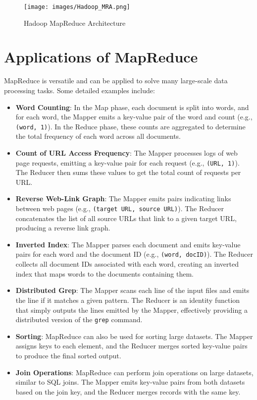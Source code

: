 \documentclass[12pt]{article}
\begin{document}
\begin{figure}[htbp]
    \centering
    \texttt{[image: images/Hadoop\_MRA.png]}
    \caption{Hadoop MapReduce Architecture}
    \label{fig:mapreduce}
\end{figure}

\section{Applications of MapReduce}
MapReduce is versatile and can be applied to solve many large-scale data processing tasks. Some detailed examples include:

\begin{itemize}
    \item \textbf{Word Counting}: In the Map phase, each document is split into words, and for each word, the Mapper emits a key-value pair of the word and count (e.g., \texttt{(word, 1)}). In the Reduce phase, these counts are aggregated to determine the total frequency of each word across all documents.
    
    \item \textbf{Count of URL Access Frequency}: The Mapper processes logs of web page requests, emitting a key-value pair for each request (e.g., \texttt{(URL, 1)}). The Reducer then sums these values to get the total count of requests per URL.
    
    \item \textbf{Reverse Web-Link Graph}: The Mapper emits pairs indicating links between web pages (e.g., \texttt{(target URL, source URL)}). The Reducer concatenates the list of all source URLs that link to a given target URL, producing a reverse link graph.
    
    \item \textbf{Inverted Index}: The Mapper parses each document and emits key-value pairs for each word and the document ID (e.g., \texttt{(word, docID)}). The Reducer collects all document IDs associated with each word, creating an inverted index that maps words to the documents containing them.
    
    \item \textbf{Distributed Grep}: The Mapper scans each line of the input files and emits the line if it matches a given pattern. The Reducer is an identity function that simply outputs the lines emitted by the Mapper, effectively providing a distributed version of the \texttt{grep} command.
    
    \item \textbf{Sorting}: MapReduce can also be used for sorting large datasets. The Mapper assigns keys to each element, and the Reducer merges sorted key-value pairs to produce the final sorted output.
    
    \item \textbf{Join Operations}: MapReduce can perform join operations on large datasets, similar to SQL joins. The Mapper emits key-value pairs from both datasets based on the join key, and the Reducer merges records with the same key.
\end{itemize}
\end{document}
